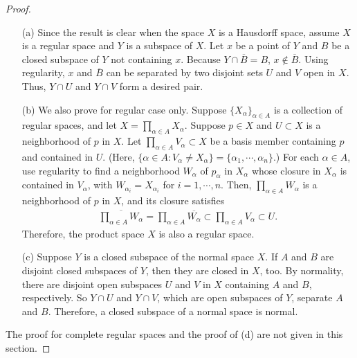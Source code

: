 \begin{proof}
    \begin{enumerate}
        \item[(a)]
        {           
            Since the result is clear when the space $X$ is a Hausdorff space, assume $X$ is a regular space and $Y$ is a subspace of $X$.
            Let $x$ be a point of $Y$ and $B$ be a closed subspace of $Y$ not containing $x$.
            Because $Y\cap\overline{B}=B$, $x\notin\overline{B}$.
            Using regularity, $x$ and $\overline{B}$ can be separated by two disjoint sets $U$ and $V$ open in $X$.
            Thus, $Y\cap U$ and $Y\cap V$ form a desired pair.
        }
        \item[(b)]
        {
            We also prove for regular case only.
            Suppose $\{X_\alpha\}_{\alpha\in A}$ is a collection of regular spaces, and let $X=\prod_{\alpha\in A}X_\alpha$.
            Suppose $p\in X$ and $U\subset X$ is a neighborhood of $p$ in $X$.
            Let $\prod_{\alpha\in A}V_\alpha\subset X$ be a basis member containing $p$ and contained in $U$.
            (Here, $\{\alpha\in A:V_\alpha\neq X_\alpha\}=\{\alpha_1, \cdots, \alpha_n\}$.)
            For each $\alpha\in A$, use regularity to find a neighborhood $W
            _\alpha$ of $p_\alpha$ in $X_\alpha$ whose closure in $X_\alpha$ is contained in $V_\alpha$, with $W_{\alpha_i}=X_{\alpha_i}$ for $i=1, \cdots, n$.
            Then, $\prod_{\alpha\in A}W_\alpha$ is a neighborhood of $p$ in $X$, and its closure satisfies
            \begin{align*}
                \overline{\prod_{\alpha\in A}W_\alpha}=\prod_{\alpha\in A}\overline{W_\alpha}\subset\prod_{\alpha\in A}V_\alpha\subset U.
            \end{align*}
            Therefore, the product space $X$ is also a regular space.
            }
        \item[(c)]
        {    
            Suppose $Y$ is a closed subspace of the normal space $X$.
            If $A$ and $B$ are disjoint closed subspaces of $Y$, then they are closed in $X$, too.
            By normality, there are disjoint open subspaces $U$ and $V$ in $X$ containing $A$ and $B$, respectively.
            So $Y\cap U$ and $Y\cap V$, which are open subspaces of $Y$, separate $A$ and $B$.
            Therefore, a closed subspace of a normal space is normal.
        }
    \end{enumerate}
    The proof for complete regular spaces and the proof of (d) are not given in this section.
\end{proof}


